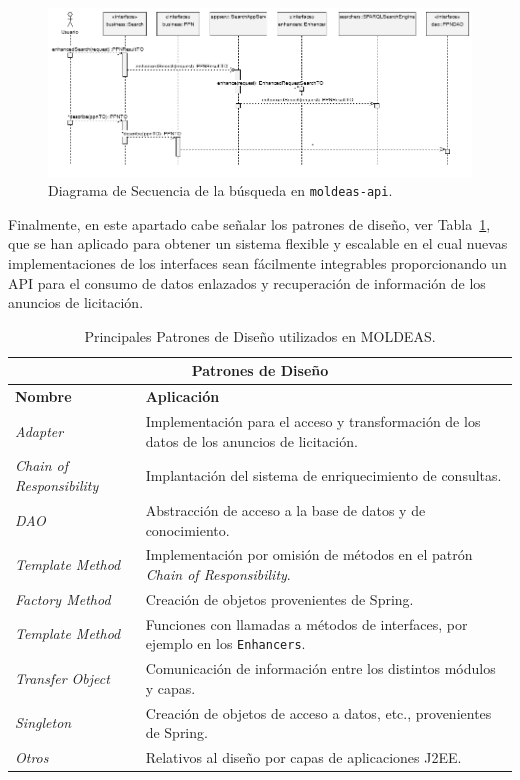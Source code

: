 \begin{figure}[!htb]
\centering
	\includegraphics[width=16cm]{images/phd/moldeas/moldeas-search}
\caption{Diagrama de Secuencia de la búsqueda en \texttt{moldeas-api}.}
\label{fig:moldeas-search}
\end{figure}


Finalmente, en este apartado cabe señalar los patrones de diseño, ver Tabla~\ref{tabla:patrones}, que se han aplicado 
para obtener un sistema flexible y escalable en el cual nuevas implementaciones 
de los interfaces sean fácilmente integrables proporcionando un API para el consumo de datos enlazados y recuperación de información de los anuncios de 
licitación.


\begin{table}[htb]
\renewcommand{\arraystretch}{1.3}
\begin{center}
\begin{tabular}{|p{6cm}|p{8cm}|}
\hline
        \multicolumn{2}{|c|}{\textbf{Patrones de Diseño}}\\        
        \hline
        \textbf{Nombre} &  \textbf{Aplicación} \\ \hline       
			\textit{Adapter}&Implementación para el acceso y transformación de los datos de los anuncios de licitación.\\ \hline
			\textit{Chain of Responsibility}&Implantación del sistema de enriquecimiento de consultas.\\ \hline
			\textit{DAO}&Abstracción de acceso a la base de datos y de conocimiento.\\ \hline
			\textit{Template Method}& Implementación por omisión de métodos en el patrón \textit{Chain of Responsibility}.\\ \hline
			\textit{Factory Method}&Creación de objetos provenientes de Spring.\\ \hline
			\textit{Template Method}&Funciones con llamadas a métodos de interfaces, por ejemplo en los \texttt{Enhancers}.\\ \hline
			\textit{Transfer Object}&Comunicación de información entre los distintos módulos y capas.\\\hline 
			\textit{Singleton}&Creación de objetos de acceso a datos, etc., provenientes de Spring.\\ \hline
			\textit{Otros}&Relativos al diseño por capas de aplicaciones J2EE.\\ \hline
		\hline
		\end{tabular}
		\caption{Principales Patrones de Diseño utilizados en MOLDEAS.}
		\label{tabla:patrones}
  \end{center}
\end{table} 

